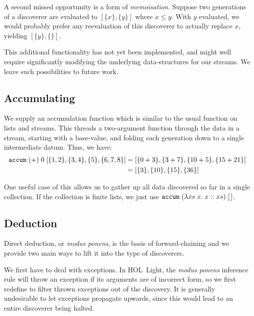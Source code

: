 A second missed opportunity is a form of \emph{memoisation}. Suppose two generations of a discoverer are evaluated to $[\{x\}, \{y\}]$ where $x \leq y$. With $y$ evaluated, we would probably prefer any reevaluation of this discoverer to actually replace $x$, yielding $[\{y\}, \{\}]$. 

This additional functionality has not yet been implemented, and might well require significantly modifying the underlying data-structures for our streams. We leave such possibilities to future work.

\subsection{Accumulating}
We supply an accumulation function which is similar to the usual  function on lists and streams. This threads a two-argument function through the data in a stream, starting with a base-value, and folding each generation down to a single intermediate datum. Thus, we have:
\begin{align*}
\texttt{accum}\;(+)\;0\;[\{1,2\}, \{3,4\}, \{5\}, \{6,7,8\}] 
&= [\{0 + 3\}, \{3 + 7\}, \{10 + 5\}, \{15 + 21\}]\\
&= [\{3\}, \{10\}, \{15\}, \{36\}]
\end{align*}

One useful case of this allows us to gather up all data discovered so far in a single collection. If the collection is finite lists, we just use $\texttt{accum}\;(\lambda xs\;x.\;x :: xs)\;[\,]$.


\subsection{Deduction}
Direct deduction, or \emph{modus ponens}, is the basis of forward-chaining and we provide two main ways to lift it into the type of discoverers. 

We first have to deal with exceptions. In HOL~Light, the \emph{modus ponens} inference rule will throw an exception if its arguments are of incorrect form, so we first redefine  to filter thrown exceptions out of the discovery. It is generally undesirable to let exceptions propagate upwards, since this would lead to an entire discoverer being halted. 

